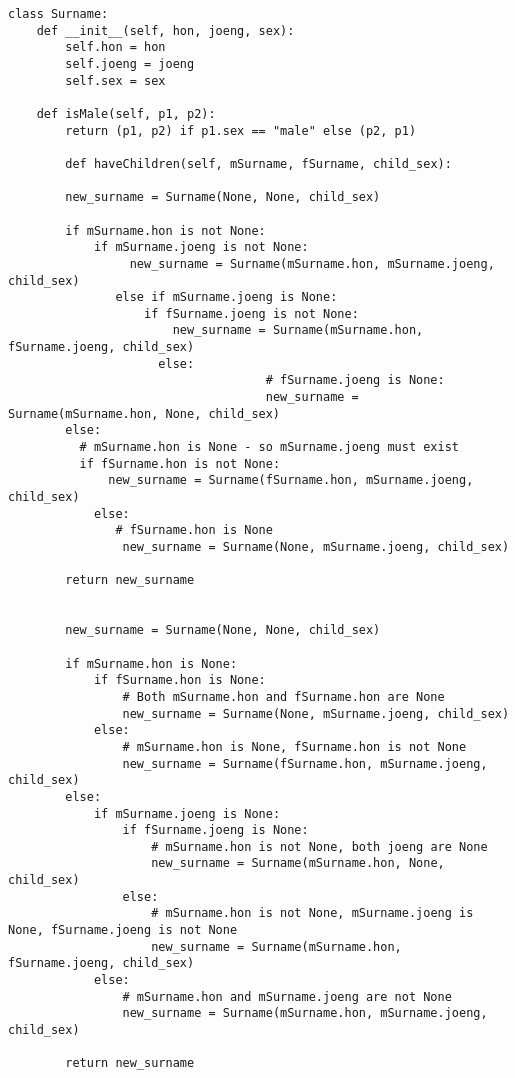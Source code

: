 \documentclass[a5paper, 10pt, openany]{book} %
\begin{document}
\begin{lstlisting}[caption={Python Surname Class}, label={lst:surname}]
  class Surname: 
    def __init__(self, hon, joeng, sex):
        self.hon = hon
        self.joeng = joeng
        self.sex = sex

    def isMale(self, p1, p2):
        return (p1, p2) if p1.sex == "male" else (p2, p1)

		def haveChildren(self, mSurname, fSurname, child_sex):
        
        new_surname = Surname(None, None, child_sex)

        if mSurname.hon is not None:
            if mSurname.joeng is not None: 
	             new_surname = Surname(mSurname.hon, mSurname.joeng, child_sex)
	           else if mSurname.joeng is None:
		           if fSurname.joeng is not None:
			           new_surname = Surname(mSurname.hon, fSurname.joeng, child_sex)
			         else:
									# fSurname.joeng is None: 
									new_surname = Surname(mSurname.hon, None, child_sex)	        
        else:
          # mSurname.hon is None - so mSurname.joeng must exist 
          if fSurname.hon is not None: 
	          new_surname = Surname(fSurname.hon, mSurname.joeng, child_sex)
	        else:
		       # fSurname.hon is None
		        new_surname = Surname(None, mSurname.joeng, child_sex)
            
        return new_surname
        
        
        new_surname = Surname(None, None, child_sex)

        if mSurname.hon is None:
            if fSurname.hon is None:
                # Both mSurname.hon and fSurname.hon are None
                new_surname = Surname(None, mSurname.joeng, child_sex)
            else:
                # mSurname.hon is None, fSurname.hon is not None
                new_surname = Surname(fSurname.hon, mSurname.joeng, child_sex)
        else:
            if mSurname.joeng is None:
                if fSurname.joeng is None:
                    # mSurname.hon is not None, both joeng are None
                    new_surname = Surname(mSurname.hon, None, child_sex)
                else:
                    # mSurname.hon is not None, mSurname.joeng is None, fSurname.joeng is not None
                    new_surname = Surname(mSurname.hon, fSurname.joeng, child_sex)
            else:
                # mSurname.hon and mSurname.joeng are not None
                new_surname = Surname(mSurname.hon, mSurname.joeng, child_sex)

        return new_surname     
   

\end{lstlisting}
\end{document}
